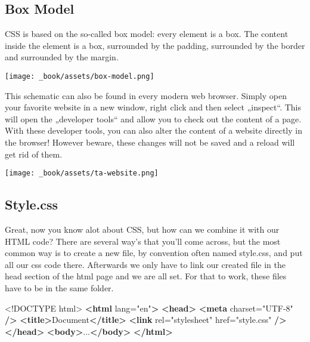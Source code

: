 \documentclass[
]{book}
\newenvironment{Shaded}{\begin{snugshade}}{\end{snugshade}}
\newcommand{\DataTypeTok}[1]{\textcolor[rgb]{0.13,0.29,0.53}{#1}}
\newcommand{\KeywordTok}[1]{\textcolor[rgb]{0.13,0.29,0.53}{\textbf{#1}}}
\newcommand{\NormalTok}[1]{#1}
\newcommand{\OtherTok}[1]{\textcolor[rgb]{0.56,0.35,0.01}{#1}}
\newcommand{\StringTok}[1]{\textcolor[rgb]{0.31,0.60,0.02}{#1}}
\begin{document}
\hypertarget{box-model}{%
\subsection*{Box Model}\label{box-model}}

CSS is based on the so-called box model: every element is a box. The content inside the element is a box, surrounded by the padding, surrounded by the border and surrounded by the margin.

\texttt{[image: \_book/assets/box-model.png]}

This schematic can also be found in every modern web browser. Simply open your favorite website in a new window, right click and then select „inspect``. This will open the „developer tools`` and allow you to check out the content of a page. With these developer tools, you can also alter the content of a website directly in the browser! However beware, these changes will not be saved and a reload will get rid of them.

\texttt{[image: \_book/assets/ta-website.png]}

\hypertarget{style.css}{%
\subsection*{Style.css}\label{style.css}}

Great, now you know alot about CSS, but how can we combine it with our HTML code? There are several way's that you'll come across, but the most common way is to create a new file, by convention often named style.css, and put all our css code there. Afterwards we only have to link our created file in the head section of the html page and we are all set. For that to work, these files have to be in the same folder.

\begin{Shaded}
\begin{Highlighting}[]
\DataTypeTok{\textless{}!DOCTYPE }\NormalTok{html}\DataTypeTok{\textgreater{}}
\KeywordTok{\textless{}html}\OtherTok{ lang=}\StringTok{"en"}\KeywordTok{\textgreater{}}
  \KeywordTok{\textless{}head\textgreater{}}
    \KeywordTok{\textless{}meta}\OtherTok{ charset=}\StringTok{"UTF{-}8"} \KeywordTok{/\textgreater{}}
    \KeywordTok{\textless{}title\textgreater{}}\NormalTok{Document}\KeywordTok{\textless{}/title\textgreater{}}
    \KeywordTok{\textless{}link}\OtherTok{ rel=}\StringTok{"stylesheet"}\OtherTok{ href=}\StringTok{"style.css"} \KeywordTok{/\textgreater{}}
  \KeywordTok{\textless{}/head\textgreater{}}
  \KeywordTok{\textless{}body\textgreater{}}\NormalTok{...}\KeywordTok{\textless{}/body\textgreater{}}
\KeywordTok{\textless{}/html\textgreater{}}
\end{Highlighting}
\end{Shaded}
\end{document}
